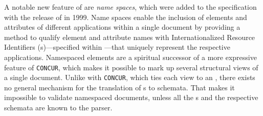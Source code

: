 \documentclass{book}
\begin{document}
        A notable new feature of  are \emph{name spaces}, which
        were added to the specification with the release of \cite{bray99} in
        1999. Name spaces enable the inclusion of elements and attributes of
        different  applications within a single 
        document by providing a method to qualify element and attribute names
        with Internationalized Resource Identifiers (s)---specified
        within \cite{rfc3987}---that uniquely represent the respective
         applications. Namespaced elements are a spiritual
        successor of a more expressive  feature of
        \texttt{CONCUR}, which makes it possible to mark up several structural
        views of a single document. Unlike with \texttt{CONCUR}, which ties each
        view to an  , there exists no general
        mechanism for the translation of s to 
        schemata. That makes it impossible to validate namespaced 
        documents, unless all the s and the respective schemata are
        known to the parser.

\end{document}
